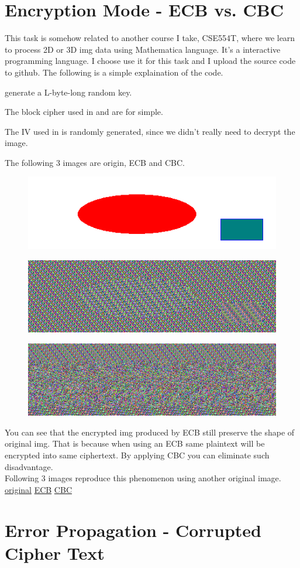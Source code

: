 \documentclass{article}
\begin{document}
    \section{Encryption Mode - ECB vs. CBC}
    This task is somehow related to another course I take, CSE554T, where we learn to process 2D or 3D img data using Mathematica language. It's a interactive programming language. I choose use it for this task and I upload the source code to github. The following is a simple explaination of the code.
    \begin{tlist}{3}
      \item[1.] generate a L-byte-long random key.
      \item[2.]The block cipher used in  and  are  for simple.
      \item[3.]The IV used in  is randomly generated, since we didn't really need to decrypt the image.
    \end{tlist}
    The following 3 images are origin, ECB and CBC.
    \begin{figure}[H]\centering\includegraphics{pic_original.png}\end{figure}
    \begin{figure}[H]\centering\includegraphics{pic_ecb.png}\end{figure}
    \begin{figure}[H]\centering\includegraphics{pic_cbc.png}\end{figure}
    You can see that the encrypted img produced by ECB still preserve the shape of original img. That is because when using an ECB same plaintext will be encrypted into same ciphertext. By applying CBC you can eliminate such disadvantage.\\
    Following 3 images reproduce this phenomenon using another original image.
    \href{https://i.loli.net/2018/09/24/5ba874d18c3b5.jpg}{original}
    \href{https://i.loli.net/2018/09/24/5ba874d19386e.jpg}{ECB}
    \href{https://i.loli.net/2018/09/24/5ba874d193869.jpg}{CBC}

    \section{Error Propagation - Corrupted Cipher Text}
  
\end{document}
